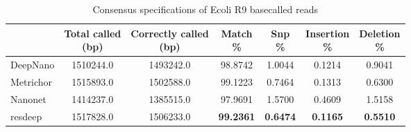 \documentclass[times, utf8, diplomski, numeric, english]{fer}
\begin{document}
\begin{table}[htb]
	\caption{Consensus specifications of Ecoli R9 basecalled reads}
	\label{tbl:spec_ecoli}
	\centering
	
	\begin{tabular}{lcccccc}
		\toprule
		{} &  \thead{Total called\\(bp)} &  \thead{Correctly called\\(bp)} &  \thead{Match\\\%} &  \thead{Snp\\\%} &  \thead{Insertion\\\%} &  \thead{Deletion\\\%} \\
		\midrule
		DeepNano  &                  1510244.0 &                      1493242.0 &          98.8742 &         1.0044 &               0.1214 &              0.9041 \\
		Metrichor &                  1515893.0 &                      1502588.0 &          99.1223 &         0.7464 &               0.1313 &              0.6300 \\
		Nanonet   &                  1414237.0 &                      1385515.0 &          97.9691 &         1.5700 &               0.4609 &              1.5158 \\
		resdeep   &                  1517828.0 &                      1506233.0 &          \textbf{99.2361} &         \textbf{0.6474} &               \textbf{0.1165} &             \textbf{ 0.5510 }\\
		\bottomrule
	\end{tabular}
	
\end{table}
\end{document}
